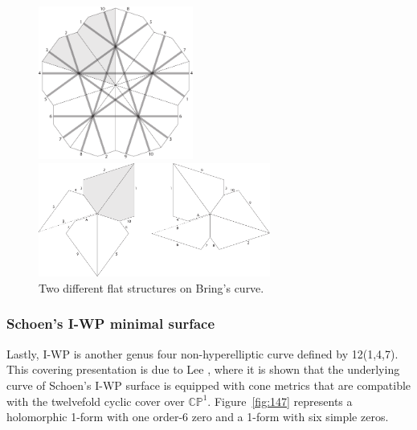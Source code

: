 \documentclass[12pt,reqno]{amsart}
\newcommand{\C}{\mathbb{C}}
\renewcommand{\P}{\mathbb{P}}
\theoremstyle{definition}
\theoremstyle{remark}
\begin{document}
\begin{figure}[htbp] %
\centering
\begin{minipage}{0.5\textwidth}
  \centering
  \includegraphics[width=2in]{figures/1243_flat.pdf}
\end{minipage}%
\begin{minipage}{0.5\textwidth}
  \centering
  \includegraphics[width=3in]{figures/1243_flat_2.pdf}
\end{minipage}
  \caption{Two different flat structures on Bring's curve.}
  \label{fig:1243}
\end{figure}

\subsubsection{Schoen's I-WP minimal surface}
Lastly, I-WP is another genus four non-hyperelliptic curve defined by 12(1,4,7). This covering presentation is due to Lee \cite{dthesis}, where it is shown that the underlying curve of Schoen's I-WP surface is equipped with cone metrics that are compatible with the twelvefold cyclic cover over $\C\P^1.$ Figure~\ref{fig:147} represents a holomorphic 1-form with one order-6 zero and a 1-form with six simple zeros.
\end{document}
